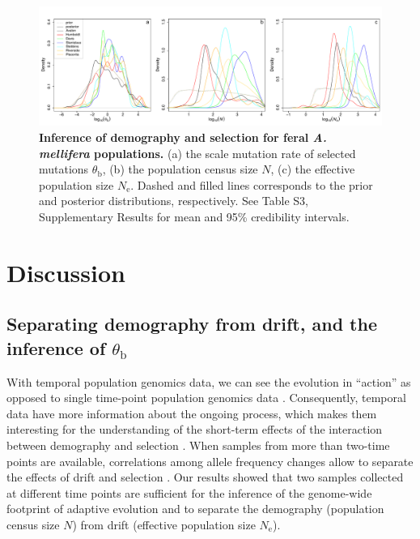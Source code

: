 \documentclass[a4paper, 12pt]{article}
\begin{document}
\begin{figure}[htb]
  \centering
  \includegraphics[width=1\textwidth]{Figures/Figure4_weighted_densityPlots_jointDemoSel_feralbees.pdf}
  \small\caption{\textbf{Inference of demography and selection for feral \textit{A. mellifera} populations.} (a) the scale mutation rate of selected mutations $\theta_{\mathrm{b}}$, (b) the population census size $N$, (c) the effective population size $N_{\mathrm{e}}$. Dashed and filled lines corresponds to the prior and posterior distributions, respectively. See Table S3, Supplementary Results for mean and 95\% credibility intervals.}
  \label{fig:postBees_jointdemosel}
\end{figure}

\section*{Discussion}

\subsection*{Separating demography from drift, and the inference of $\theta_{\mathrm{b}}$}

With temporal population genomics data, we can see the evolution in ``action'' as opposed to single time-point population genomics data \citep{Feder:2021bt}. Consequently, temporal data have more information about the ongoing process, which makes them interesting for the understanding of the short-term effects of the interaction between demography and selection \citep{Buffalo:2019ab, Dehasque:2020ku, Williams:2020gk}. When samples from more than two-time points are available, correlations among allele frequency changes allow to separate the effects of drift and selection \citep[e.g.,][]{Buffalo:2020hq,Feder:2014fe}. Our results showed that two samples collected at different time points are sufficient for the inference of the genome-wide footprint of adaptive evolution and to separate the demography (population census size $N$) from drift (effective population size $N_{\mathrm{e}}$). 
\end{document}
